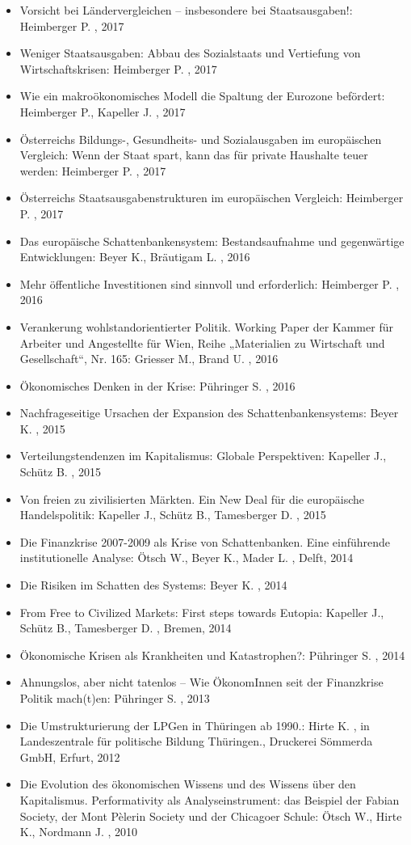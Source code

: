 \begin{itemize}
\item Vorsicht bei Ländervergleichen – insbesondere bei Staatsausgaben!: Heimberger P. , 2017
\item Weniger Staatsausgaben: Abbau des Sozialstaats und Vertiefung von Wirtschaftskrisen: Heimberger P. , 2017
\item Wie ein makroökonomisches Modell die Spaltung der Eurozone befördert: Heimberger P., Kapeller J. , 2017
\item Österreichs Bildungs-, Gesundheits- und Sozialausgaben im europäischen Vergleich: Wenn der Staat spart, kann das für private Haushalte teuer werden: Heimberger P. , 2017
\item Österreichs Staatsausgabenstrukturen im europäischen Vergleich: Heimberger P. , 2017
\item Das europäische Schattenbankensystem: Bestandsaufnahme und gegenwärtige Entwicklungen: Beyer K., Bräutigam L. , 2016
\item Mehr öffentliche Investitionen sind sinnvoll und erforderlich: Heimberger P. , 2016
\item Verankerung wohlstandorientierter Politik. Working Paper der Kammer für Arbeiter und Angestellte für Wien, Reihe „Materialien zu Wirtschaft und Gesellschaft“, Nr. 165: Griesser M., Brand U. , 2016
\item Ökonomisches Denken in der Krise: Pühringer S. , 2016
\item Nachfrageseitige Ursachen der Expansion des Schattenbankensystems: Beyer K. , 2015
\item Verteilungstendenzen im Kapitalismus: Globale Perspektiven: Kapeller J., Schütz B. , 2015
\item Von freien zu zivilisierten Märkten. Ein New Deal für die europäische Handelspolitik: Kapeller J., Schütz B., Tamesberger D. , 2015
\item Die Finanzkrise 2007-2009 als Krise von Schattenbanken. Eine einführende institutionelle Analyse: Ötsch W., Beyer K., Mader L. , Delft, 2014
\item Die Risiken im Schatten des Systems: Beyer K. , 2014
\item From Free to Civilized Markets: First steps towards Eutopia: Kapeller J., Schütz B., Tamesberger D. , Bremen, 2014
\item Ökonomische Krisen als Krankheiten und Katastrophen?: Pühringer S. , 2014
\item Ahnungslos, aber nicht tatenlos – Wie ÖkonomInnen seit der Finanzkrise Politik mach(t)en: Pühringer S. , 2013
\item Die Umstrukturierung der LPGen in Thüringen ab 1990.: Hirte K. , in Landeszentrale für politische Bildung Thüringen., Druckerei Sömmerda GmbH, Erfurt, 2012
\item Die Evolution des ökonomischen Wissens und des Wissens über den Kapitalismus. Performativity als Analyseinstrument: das Beispiel der Fabian Society, der Mont Pèlerin Society und der Chicagoer Schule: Ötsch W., Hirte K., Nordmann J. , 2010
\end{itemize}
